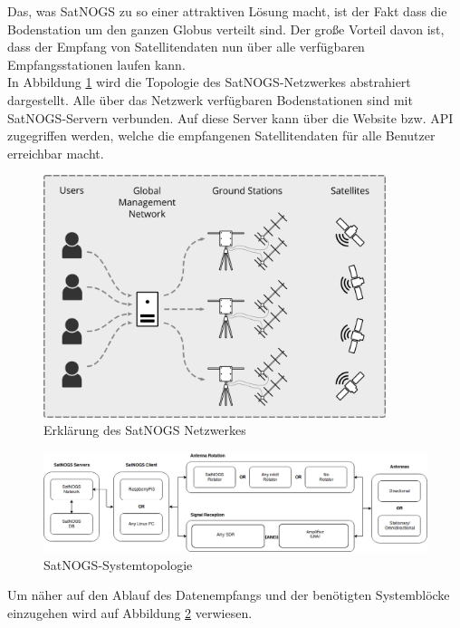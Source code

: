 \documentclass[12pt]{scrreprt}
\begin{document}
	Das, was SatNOGS zu so einer attraktiven Lösung macht, ist der Fakt dass die Bodenstation um den ganzen Globus verteilt sind. Der große Vorteil davon ist, dass der Empfang von Satellitendaten nun über alle verfügbaren Empfangsstationen laufen kann.\\
	
	In Abbildung \ref{fig:SatNOGS_Erklärung} wird die Topologie des SatNOGS-Netzwerkes abstrahiert dargestellt.
	Alle über das Netzwerk verfügbaren Bodenstationen sind mit SatNOGS-Servern verbunden. Auf diese Server kann über die Website bzw. API zugegriffen werden, welche die empfangenen Satellitendaten für alle Benutzer erreichbar macht.
	
	\begin{figure}[h]
		\centering
			\includegraphics[width=10cm]{../ref/SatNOGS_explanation}
			\caption{Erklärung des SatNOGS Netzwerkes}
			\label{fig:SatNOGS_Erklärung}
	\end{figure}	
	
	\begin{figure}[h]
		\centering
			\includegraphics[width=16cm]{../ref/SatNOGS_BlockDiagram}
			\caption{SatNOGS-Systemtopologie}
			\label{fig:SatNOGS_Systemtopologie}
	\end{figure}
	
	Um näher auf den Ablauf des Datenempfangs und der benötigten Systemblöcke einzugehen wird auf Abbildung \ref{fig:SatNOGS_Systemtopologie} verwiesen.\\
\end{document}
